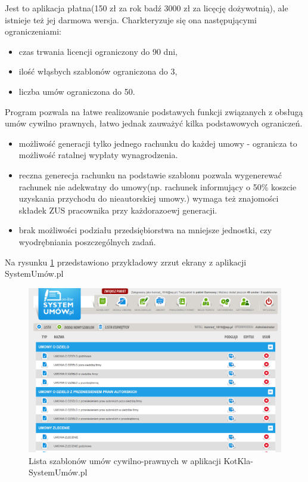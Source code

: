Jest to aplikacja płatna(150 zł za rok badź 3000 zł za licęcję dożywotnią), ale istnieje też jej darmowa wersja. Charkteryzuje się ona następującymi ograniczeniami:
\begin{itemize}
	\item czas trwania licencji ograniczony do 90 dni,
	\item ilość włąsbych szablonów ograniczona do 3,
	\item liczba umów ograniczona do 50.
\end{itemize}
Program pozwala na łatwe realizowanie podstawych funkcji związanych z obsługą umów cywilno prawnych, łatwo jednak zauważyć kilka podstawowych ograniczeń.
\begin{itemize}
	\item możliwość generacji tylko jednego rachunku do każdej umowy - ogranicza to możliwość ratalnej wypłaty wynagrodzenia.
	\item reczna generecja rachunku na podstawie szablonu pozwala wygenerewać rachunek nie adekwatny do umowy(np. rachunek informujący o 50\% koszcie uzyskania przychodu do nieautorskiej umowy.) wymaga też znajomości składek ZUS pracownika przy każdorazoewj generacji.
	\item brak możliwości podziału przedsiębiorstwa na mniejsze jednostki, czy wyodrębniania poszczególnych zadań.
\end{itemize}

Na rysunku \ref{kotkla-systemumow} przedstawiono przykładowy zrzut ekrany z aplikacji SystemUmów.pl

\begin{figure}[tdh]
    \begin{center}
	\includegraphics[scale=.4]{img/kotkla-systemumow.png}
	\caption{Lista szablonów umów cywilno-prawnych w aplikacji KotKla-SystemUmów.pl}
	\label{kotkla-systemumow}
    \end{center}
\end{figure}

